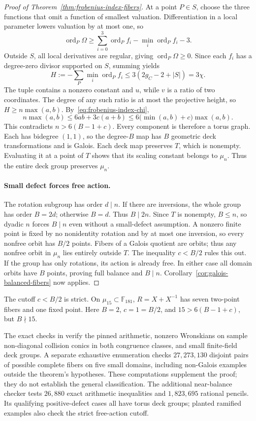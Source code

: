 \documentclass[11pt,letterpaper]{article}
\theoremstyle{definition}
\theoremstyle{remark}
\begin{document}
\begin{proof}[Proof of Theorem~\ref{thm:frobenius-index-fibers}]
At a point $P\in S$, choose the three functions that omit a
function of smallest valuation. Differentiation in a local
parameter lowers valuation by at most one, so
\[
 \operatorname{ord}_P\Omega\ge
 \sum_{i=0}^3\operatorname{ord}_P f_i
 -\min_i\operatorname{ord}_P f_i-3.
\]
Outside $S$, all local derivatives are regular, giving
$\operatorname{ord}_P\Omega\ge0$. Since each $f_i$ has a
degree-zero divisor supported on $S$, summing yields
\[
 H:=-\sum_P\min_i\operatorname{ord}_P f_i
 \le 3(2g_C-2+|S|)=3\chi.
\]
The tuple contains a nonzero constant and $u$, while $v$ is a
ratio of two coordinates. The degree of any such ratio is at most
the projective height, so $H\ge n\max(a,b)$.
By~\eqref{eq:frobenius-index-chi},
\[
 n\max(a,b)\le6ab+3c(a+b)
 \le6\bigl(\min(a,b)+c\bigr)\max(a,b).
\]
This contradicts $n>6(B-1+c)$. Every component is therefore a
torus graph. Each has bidegree $(1,1)$, so the degree-$B$ map has
$B$ geometric deck transformations and is Galois. Each deck map
preserves $T$, which is nonempty. Evaluating it at a point of $T$
shows that its scaling constant belongs to $\mu_n$. Thus the entire
deck group preserves $\mu_n$.

\paragraph{Small defect forces free action.}
The rotation subgroup has order $d\mid n$. If there are inversions,
the whole group has order $B=2d$; otherwise $B=d$. Thus $B\mid2n$.
Since $T$ is nonempty, $B\le n$, so dyadic $n$ forces $B\mid n$
even without a small-defect assumption. A nonzero finite point is fixed
by no nonidentity rotation and by at most one inversion, so every
nonfree orbit has $B/2$ points. Fibers of a Galois quotient are
orbits; thus any nonfree orbit in $\mu_n$ lies entirely outside $T$.
The inequality $c<B/2$ rules this out. If the group has only
rotations, its action is already free. In either case all domain
orbits have $B$ points, proving full balance and $B\mid n$.
Corollary~\ref{cor:galois-balanced-fibers} now applies.
\end{proof}

The cutoff $c<B/2$ is strict. On $\mu_{15}\subset\mathbb F_{181}$,
$R=X+X^{-1}$ has seven two-point fibers and one fixed point.
Here $B=2$, $c=1=B/2$, and $15>6(B-1+c)$, but $B\nmid15$.

The exact checks in
 verify the pinned
arithmetic, nonzero Wronskians on sample non-diagonal collision conics
in both congruence classes, and small finite-field deck groups.
A separate exhaustive enumeration checks $27{,}273{,}130$ disjoint
pairs of possible complete fibers on five small domains, including
non-Galois examples outside the theorem's hypotheses. These computations
supplement the proof; they do not establish the general classification.
The additional near-balance checker tests $26{,}880$ exact arithmetic
inequalities and $1{,}823{,}695$ rational pencils. Its qualifying
positive-defect cases all have torus deck groups; planted ramified
examples also check the strict free-action cutoff.
\end{document}
